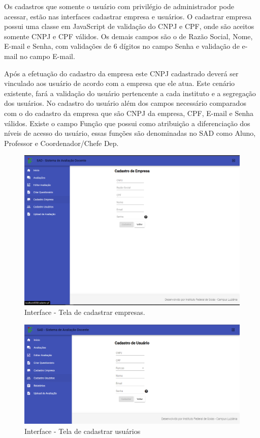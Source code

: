    Os cadastros que somente o usuário com privilégio de administrador pode acessar, estão nas interfaces cadastrar empresa e usuários. O cadastrar empresa possui uma classe em JavaScript de validação do CNPJ e CPF, onde são aceitos somente CNPJ e CPF válidos. Os demais campos são o de Razão Social, Nome, E-mail e Senha, com validações de 6 dígitos no campo Senha e validação de e-mail no campo E-mail.
    
    Após a efetuação do cadastro da empresa este CNPJ cadastrado deverá ser vinculado aos usuário de acordo com a empresa que ele atua. Este cenário existente, fará a validação do usuário pertencente a cada instituto e a segregação dos usuários. No cadastro do usuário além dos campos necessário comparados com o do cadastro da empresa que são CNPJ da empresa, CPF, E-mail e Senha válidos. Existe o campo Função que possui como atribuição a diferenciação dos níveis de acesso do usuário, essas funções são denominadas no SAD como Aluno, Professor e Coordenador/Chefe Dep.


        \begin{figure}[h]
        \centering
        \includegraphics[width=1.0\textwidth]{./img/Empresa.png}
        \caption{Interface - Tela de cadastrar empresas.}
        \label{fig:Empresas}
        \end{figure}
        
        \begin{figure}[h]
        \centering
        \includegraphics[width=1.0\textwidth]{./img/Usuario.png}
        \caption{Interface - Tela de cadastrar usuários}
        \label{fig:Usuario}
        \end{figure}

